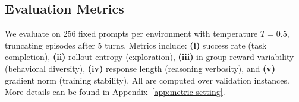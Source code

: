 \subsection{Evaluation Metrics}
We evaluate on 256 fixed prompts per environment with temperature $T{=}0.5$, truncating episodes after 5 turns. Metrics include: 
\textbf{(i)} success rate (task completion),
\textbf{(ii)} rollout entropy (exploration),
\textbf{(iii)} in-group reward variability (behavioral diversity),
\textbf{(iv)} response length (reasoning verbosity),
and \textbf{(v)} gradient norm (training stability).
All are computed over validation instances. More details can be found in Appendix~\ref{app:metric-setting}.
\vspace{-5pt}







